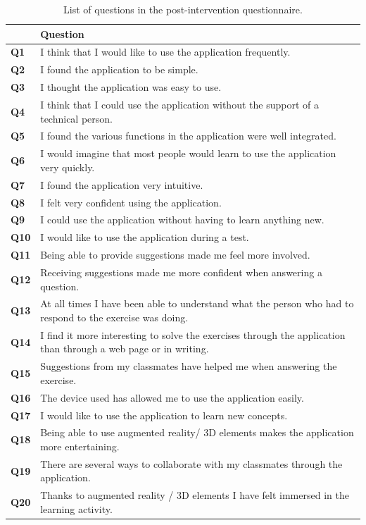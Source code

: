 \documentclass[pdflatex,sn-basic,iicol]{sn-jnl}%
\begin{document}
\begin{table}[htbp]\centering
\caption{List of questions in the post-intervention questionnaire.}
\begin{tabular}{p{}>{\arraybackslash}p{}}
\toprule
 & Question\\
\midrule
    \textbf{Q1} & I think that I would like to use the application frequently. \\
    \textbf{Q2} & I found the application to be simple. \\
    \textbf{Q3} &I thought the application was easy to use. \\
    \textbf{Q4} & I think that I could use the application without the support of a technical person. \\
    \textbf{Q5} & I found the various functions in the application were well integrated. \\
    \textbf{Q6} & I would imagine that most people would learn to use the application very quickly. \\
    \textbf{Q7} & I found the application very intuitive. \\
    \textbf{Q8} & I felt very confident using the application. \\
    \textbf{Q9} & I could use the application without having to learn anything new. \\
    \textbf{Q10} & I would like to use the application during a test. \\
    \textbf{Q11} & Being able to provide suggestions made me feel more involved. \\
    \textbf{Q12} & Receiving suggestions made me more confident when answering a question. \\
    \textbf{Q13} & At all times I have been able to understand what the person who had to respond to the exercise was doing. \\
    \textbf{Q14} & I find it more interesting to solve the exercises through the application than through a web page or in writing. \\
    \textbf{Q15} & Suggestions from my classmates have helped me when answering the exercise. \\
    \textbf{Q16} & The device used  has allowed me to use the application easily. \\
    \textbf{Q17} & I would like to use the application to learn new concepts. \\
    \textbf{Q18} & Being able to use augmented reality/ 3D elements makes the application more entertaining. \\
    \textbf{Q19} & There are several ways to collaborate with my classmates through the application. \\
    \textbf{Q20} & Thanks to augmented reality / 3D elements I have felt immersed in the learning activity. \\
\bottomrule
\end{tabular}
\label{tab:summaryreqs}
\end{table}
\end{document}
